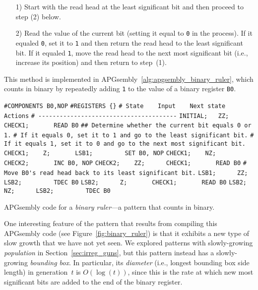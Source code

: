 \begin{enumerate}
	\item[1)] Start with the read head at the least significant bit and then proceed to step (2) below.\smallskip
	
	\item[2)] Read the value of the current bit (setting it equal to \texttt{0} in the process). If it equaled \texttt{0}, set it to \texttt{1} and then return the read head to the least significant bit. If it equaled \texttt{1}, move the read head to the next most significant bit (i.e., increase its position) and then return to step~(1).\smallskip
\end{enumerate}

This method is implemented in APGsembly~\ref{alg:apgsembly_binary_ruler}, which counts in binary by repeatedly adding \texttt{1} to the value of a binary register \texttt{B0}.

\begin{apgsembly}
	\begin{algorithmic}\small
		\State \verb|#COMPONENTS B0,NOP|
		\State \verb|#REGISTERS {}|
		\State \verb|# State    Input    Next state    Actions|
		\State \verb|# ---------------------------------------|
		\State \verb|INITIAL;   ZZ;      CHECK1;       READ B0|
		\State
		\State \verb|## Determine whether the current bit equals 0 or 1.|
		\State \verb|# If it equals 0, set it to 1 and go to the least significant bit.|
		\State \verb|# If it equals 1, set it to 0 and go to the next most significant bit.|
		\State \verb|CHECK1;    Z;       LSB1;         SET B0, NOP|
		\State \verb|CHECK1;    NZ;      CHECK2;       INC B0, NOP|
		\State \verb|CHECK2;    ZZ;      CHECK1;       READ B0|
		\State
		\State \verb|# Move B0's read head back to its least significant bit.|
		\State \verb|LSB1;      ZZ;      LSB2;         TDEC B0|
		\State \verb|LSB2;      Z;       CHECK1;       READ B0|
		\State \verb|LSB2;      NZ;      LSB2;         TDEC B0|
	\end{algorithmic}
	\caption{APGsembly code for a \emph{binary ruler}---a pattern that counts in binary.}\label{alg:apgsembly_binary_ruler}
\end{apgsembly}

One interesting feature of the pattern that results from compiling this APGsembly code (see Figure~\ref{fig:binary_ruler}) is that it exhibits a new type of slow growth that we have not yet seen. We explored patterns with slowly-growing \emph{population} in Section~\ref{sec:irreg_guns}, but this pattern instead has a slowly-growing \emph{bounding box}. In particular, its \emph{diameter} (i.e., longest bounding box side length) in generation~$t$ is $O(\log(t))$, since this is the rate at which new most significant bits are added to the end of the binary register.

